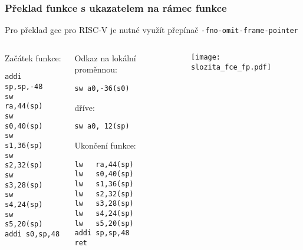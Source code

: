 \documentclass{beamer}
\begin{document}
\begin{frame}[fragile,shrink=5]
\frametitle{Překlad funkce s ukazatelem na rámec funkce}

Pro překlad gcc pro RISC-V je nutné využít přepínač \texttt{-fno-omit-frame-pointer}
\begin{columns}
\begin{column}{0.25\textwidth}
Začátek funkce:

\begin{verbatim}
addi sp,sp,-48
sw   ra,44(sp)
sw   s0,40(sp)
sw   s1,36(sp)
sw   s2,32(sp)
sw   s3,28(sp)
sw   s4,24(sp)
sw   s5,20(sp)
addi s0,sp,48
\end{verbatim}
\end{column}   
\begin{column}{0.4\textwidth}
Odkaz na lokální proměnnou:

\begin{verbatim}
sw a0,-36(s0)
\end{verbatim}
dříve:
\begin{verbatim}
sw a0, 12(sp)
\end{verbatim}



Ukončení funkce:

\begin{verbatim}
lw   ra,44(sp)
lw   s0,40(sp)
lw   s1,36(sp)
lw   s2,32(sp)
lw   s3,28(sp)
lw   s4,24(sp)
lw   s5,20(sp)
addi sp,sp,48
ret
\end{verbatim}
\end{column}
\begin{column}{0.35\textwidth}  
\texttt{[image: slozita\_fce\_fp.pdf]}
\end{column}
\end{columns}
\end{frame}
\end{document}
